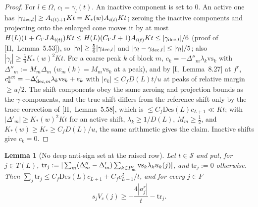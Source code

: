 \documentclass[10pt]{amsart}
\newtheorem{lemma}[theorem]{Lemma}
\theoremstyle{definition}
\theoremstyle{remark}
\begin{document}
\begin{proof}
For $l\in\Omega$, $c_l=\gamma_l(t)$.  An inactive component is set to $0$.  An
active one has $|\gamma_{{\rm dec},l}|\ge A_{i(t)+1}Kt=K_*(w)A_{i(t)}Kt$; zeroing
the inactive components and projecting onto the enlarged cone moves it by at
most $H(L)(1+C_\Gamma JA_{i(t)})Kt\le H(L)(C_\Gamma J+1)A_{i(t)}Kt\le
|\gamma_{{\rm dec},l}|/6$ (proof of [II,~Lemma~5.53]), so $|\gamma_l|\ge
\frac56|\gamma_{{\rm dec},l}|$ and $|\gamma_l-\gamma_{{\rm dec},l}|\le|\gamma_l|/5$;
also $|\gamma_l|\ge\frac56K_*(w)^2Kt$.  For a coarse peak $k$ of block $m$,
$c_k=-\Delta''_m\lambda_k\mathrm{vs}_k$ with $\Delta''_m:=M_m\Delta_m$
($w_m(k)=M_m\mathrm{vs}_k$ at a peak), and by [I,~Lemma~8.27] at $f^r$,
$c^{\rm act}_k=-\Delta'_{{\rm dec},m}\lambda_k\mathrm{vs}_k+e_k$ with $|e_k|\le
C_fD(L)t/u$ at peaks of relative margin $\ge u/2$.  The shift components obey
the same zeroing and projection bounds as the $\gamma$-components, and the
true shift differs from the reference shift only by the trace correction of
[II,~Lemma~5.58], which is $\le C_f\mathrm{Des}(L)c_{L+1}\ll Kt$; with
$|\Delta'_m|\ge K_*(w)^2Kt$ for an active shift, $\lambda_k\ge1/D(L)$,
$M_m\ge\frac12$, and $K_*(w)\ge K_*\ge C_fD(L)/u$, the same arithmetic gives the
claim.  Inactive shifts give $c_k=0$.
\end{proof}

\begin{lemma}[No deep anti-sign set at the raised row]\label{lem:III-nodeep}
Let $t\in\mathcal S$ and put, for $j\in T(L)$,
$\mathrm{tr}_j:=|\sum_m(\Delta''_m-\Delta'_m)\sum_{k\in P^{\rm c}_m}\mathrm{vs}_k
\lambda_ku_k(j)|$, and $\mathrm{tr}_j:=0$ otherwise.  Then
$\sum_j\mathrm{tr}_j\le C_f\mathrm{Des}(L)c_{L+1}+C_fc_{L+1}^2/t$, and for every
$j\in F$
\[
 s_jV_c(j)\ge-\frac{4|a^r_j|}t-\mathrm{tr}_j .
\]
\end{lemma}
\end{document}
